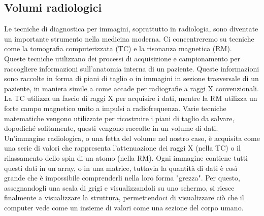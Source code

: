 \subsection{Volumi radiologici}\label{sec:volumi-radiologici}
Le tecniche di diagnostica per immagini, soprattutto in radiologia, sono diventate un importante strumento nella medicina moderna. Ci concentreremo su tecniche come la tomografia computerizzata (TC) e la risonanza magnetica (RM).
\\
Queste tecniche utilizzano dei processi di acquisizione e campionamento per raccogliere informazioni sull'anatomia interna di un paziente. Queste informazioni sono raccolte in forma di piani di taglio o in immagini in sezione trasversale di un paziente, in maniera simile a come accade per radiografie a raggi X convenzionali. La TC utilizza un fascio di raggi X per acquisire i dati, mentre la RM utilizza un forte campo magnetico unito a  impulsi a radiofrequenza. Varie tecniche matematiche vengono utilizzate per ricostruire i piani di taglio da salvare, dopodiché solitamente, questi vengono raccolte in un volume di dati.
\\
Un'immagine radiologica, o una fetta del volume nel nostro caso, è acquisita come una serie di valori che rappresenta l'attenuazione dei raggi X (nella TC) o il rilassamento dello spin di un atomo (nella RM). Ogni immagine contiene tutti questi dati in un array, o in una matrice, tuttavia la quantità di dati è così grande che è impossibile comprenderli nella loro forma "grezza". Per questo, assegnandogli una scala di grigi e visualizzandoli su uno schermo, si riesce finalmente a visualizzare la struttura, permettendoci di visualizzare ciò che il computer vede come un insieme di valori come una sezione del corpo umano.

